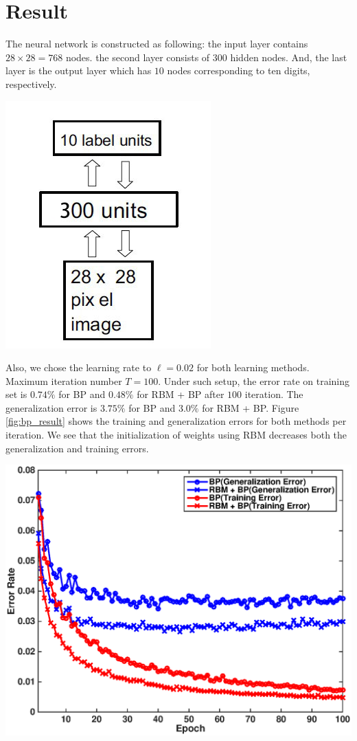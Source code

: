 \documentclass{article} %
\begin{document}
\section{Result}
The neural network is constructed as following: the input layer contains $28 \times 28 = 768$ nodes. the second layer consists of $300$ hidden nodes. And, the last layer is the output layer which has $10$ nodes corresponding to ten digits, respectively.

\begin{center}
\includegraphics[width=0.3\linewidth]{NN_BP.jpg}
\end{center}

Also, we chose the learning rate to $ \ell = 0.02 $ for both learning methods. Maximum iteration number $ T = 100 $.
Under such setup, the error rate on training set is $0.74\%$ for BP and $0.48\%$ for RBM + BP after $100$ iteration.  The generalization error is  $3.75\%$ for BP and $3.0\%$ for RBM + BP.
Figure \ref{fig:bp_result} shows the training and generalization errors for both methods per iteration. We see that the initialization of weights using RBM decreases both the generalization and training errors.

\begin{center}
\includegraphics[width=1\linewidth]{bp_simul.eps}
\label{fig:bp_result}
\end{center}
\end{document}
